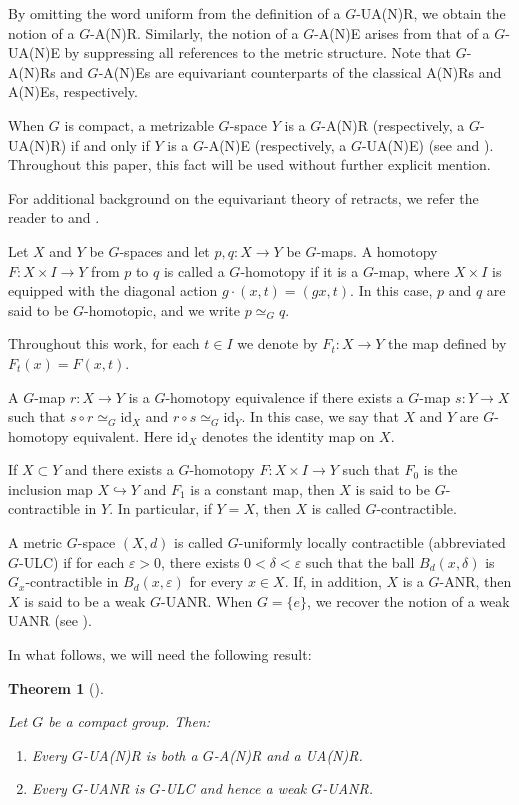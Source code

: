 \documentclass[12pt]{amsart}
\newtheorem{theorem}{Theorem}[section]
\theoremstyle{definition}
\begin{document}
	By omitting the word uniform from the definition of a $G$-UA(N)R, we obtain the notion of a $G$-A(N)R. Similarly, the notion of a $G$-A(N)E arises from that of a $G$-UA(N)E by suppressing all references to the metric structure. Note that $G$-A(N)Rs and $G$-A(N)Es are equivariant counterparts of the classical A(N)Rs and A(N)Es, respectively.
	
	When $G$ is compact, a metrizable $G$-space $Y$ is a $G$-A(N)R (respectively, a $G$-UA(N)R) if and only if $Y$ is a $G$-A(N)E (respectively, a $G$-UA(N)E) (see \cite{A3} and \cite{A10}). Throughout this paper, this fact will be used without further explicit mention.
	
	For additional background on the equivariant theory of retracts, we refer the reader to \cite{A2} and \cite{A5}.
		
	Let $X$ and $Y$ be $G$-spaces and let $p,q : X \to Y$ be $G$-maps. A homotopy $F : X \times I \to Y$ from $p$ to $q$ is called a $G$-homotopy if it is a $G$-map, where $X \times I$ is equipped with the diagonal action $g \cdot (x,t) = (gx,t)$. In this case, $p$ and $q$ are said to be $G$-homotopic, and we write $p \simeq_G q$.
	
	Throughout this work, for each $t \in I$ we denote by $F_t : X \rightarrow Y$ the map defined by $F_t(x) = F(x, t)$.
	
	A $G$-map $r:X\to Y$ is a $G$-homotopy equivalence if there exists a $G$-map $s: Y\to X$ such that $s\circ r\simeq_G\text{id}_X$ and $r\circ s\simeq_G\text{id}_Y$. In this case, we say that $X$ and $Y$ are $G$-homotopy equivalent. Here $\text{id}_X$ denotes the identity map on $X$.
	
	If $X\subset Y$ and there exists a $G$-homotopy $F: X\times I\to Y$ such that $F_0$ is the inclusion map $X\hookrightarrow Y$ and $F_1$ is a constant map, then $X$ is said to be $G$-contractible in $Y$. In particular, if $Y=X$, then $X$ is called $G$-contractible.
	
	A metric $G$-space $(X,d)$ is called $G$-uniformly locally contractible (abbreviated $G$-ULC) if for each $\varepsilon>0$, there exists $0<\delta<\varepsilon$ such that the ball $B_d(x,\delta)$ is $G_x$-contractible in $B_d(x,\varepsilon)$ for every $x\in X$. If, in addition, $X$ is a $G$-ANR, then $X$ is said to be a weak $G$-UANR. When $G = \{e\}$, we recover the notion of a weak UANR (see \cite{EM1}).

	In what follows, we will need the following result:
	
	\begin{theorem}[\cite{A10}]\label{lemautil} \rm{
		Let $G$ be a compact group. Then:
		
		\begin{enumerate}
			\item[(i)] Every $G$-UA(N)R is both a $G$-A(N)R and a UA(N)R.
			\item[(ii)] Every $G$-UANR is $G$-ULC and hence a weak $G$-UANR.
		\end{enumerate}}
	\end{theorem}
	
\end{document}
